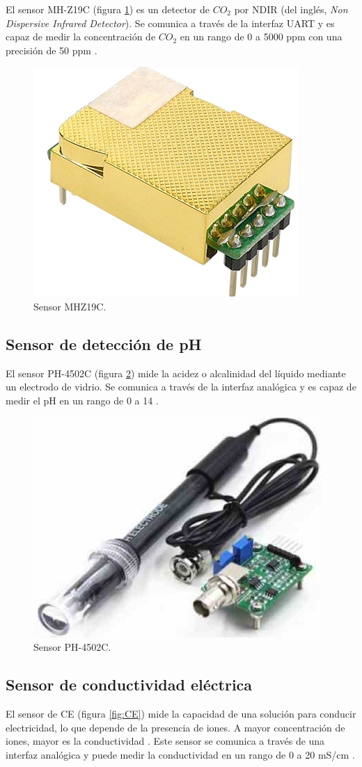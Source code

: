 El sensor MH-Z19C (figura \ref{fig:MHZ19C}) es un detector de $CO_2$ por NDIR
(del inglés, \textit{Non Dispersive Infrared Detector}). Se comunica a través
de la interfaz UART y es capaz de medir la concentración de $CO_2$ en un rango
de 0 a 5000 ppm con una precisión de 50 ppm \cite{WINSEN_MHZ19C}.

\begin{figure}[H]
	\centering
	\includegraphics[height=.15\textwidth]{./Images/6.png}
	\caption{Sensor MHZ19C\protect\footnotemark.}
	\label{fig:MHZ19C}
\end{figure}


\subsection{Sensor de detección de pH}

El sensor PH-4502C (figura \ref{fig:PH4502C}) mide la acidez o alcalinidad del
líquido mediante un electrodo de vidrio. Se comunica a través de la interfaz
analógica y es capaz de medir el pH en un rango de 0 a 14 \cite{PH-4502C}.

\begin{figure}[H]
	\centering
	\includegraphics[height=.15\textwidth]{./Images/7.png}
	\caption{Sensor PH-4502C\protect\footnotemark.}
	\label{fig:PH4502C}
\end{figure}


\subsection{Sensor de conductividad eléctrica}

El sensor de CE (figura \ref{fig:CE}) mide la capacidad de una solución para
conducir electricidad, lo que depende de la presencia de iones. A mayor
concentración de iones, mayor es la conductividad \cite{MTConductivitySensor}.
Este sensor se comunica a través de una interfaz analógica y puede medir la
conductividad en un rango de 0 a 20 mS/cm \cite{EC-Sensor}.

